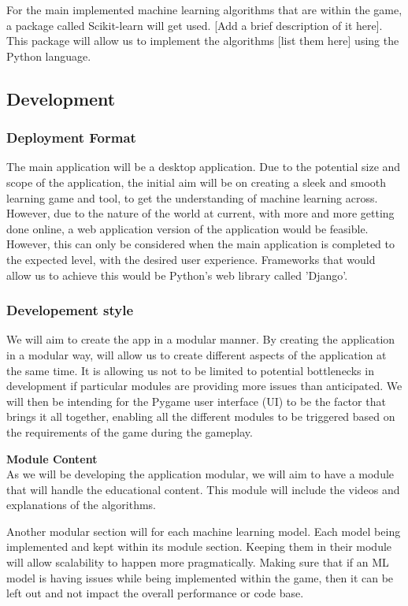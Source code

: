 \documentclass[a4paper,10pt]{article}
\begin{document}
For the main implemented machine learning algorithms that are within the game, a package called Scikit-learn will get used. [Add a brief description of it here]. This package will allow us to implement the algorithms [list them here] using the Python language.

\subsection{Development}
\subsubsection{Deployment Format}
The main application will be a desktop application.  Due to the potential size and scope of the application, the initial aim will be on creating a sleek and smooth learning game and tool, to get the understanding of machine learning across. However, due to the nature of the world at current, with more and more getting done online, a web application version of the application would be feasible. However, this can only be considered when the main application is completed to the expected level, with the desired user experience. Frameworks that would allow us to achieve this would be Python's web library called 'Django'.

\subsubsection{Developement style}
We will aim to create the app in a modular manner. By creating the application in a modular way, will allow us to create different aspects of the application at the same time. It is allowing us not to be limited to potential bottlenecks in development if particular modules are providing more issues than anticipated. We will then be intending for the Pygame user interface (UI) to be the factor that brings it all together, enabling all the different modules to be triggered based on the requirements of the game during the gameplay.

\textbf{Module Content}\\
As we will be developing the application modular, we will aim to have a module that will handle the educational content. This module will include the videos and explanations of the algorithms.

Another modular section will for each machine learning model. Each model being implemented and kept within its module section. Keeping them in their module will allow scalability to happen more pragmatically. Making sure that if an ML model is having issues while being implemented within the game, then it can be left out and not impact the overall performance or code base.
\end{document}
